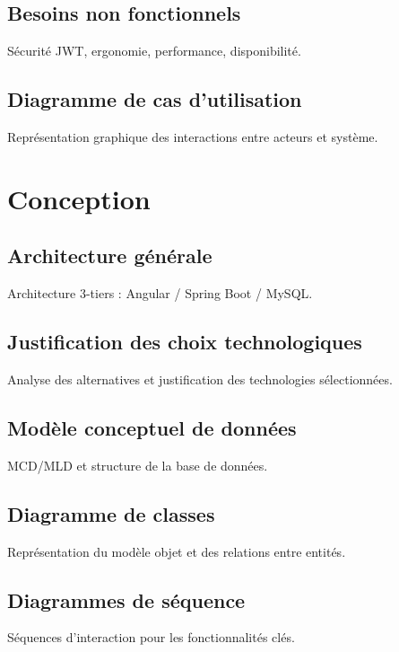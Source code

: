 \documentclass[14pt,a4paper]{article}
\begin{document}
\subsection{Besoins non fonctionnels}
\hspace{.8cm} Sécurité JWT, ergonomie, performance, disponibilité.

\subsection{Diagramme de cas d'utilisation}
\hspace{.8cm} Représentation graphique des interactions entre acteurs et système.

\newpage
\section{Conception}

\subsection{Architecture générale}
\hspace{.8cm} Architecture 3-tiers : Angular / Spring Boot / MySQL.

\subsection{Justification des choix technologiques}
\hspace{.8cm} Analyse des alternatives et justification des technologies sélectionnées.

\subsection{Modèle conceptuel de données}
\hspace{.8cm} MCD/MLD et structure de la base de données.

\subsection{Diagramme de classes}
\hspace{.8cm} Représentation du modèle objet et des relations entre entités.

\subsection{Diagrammes de séquence}
\hspace{.8cm} Séquences d'interaction pour les fonctionnalités clés.
\end{document}
